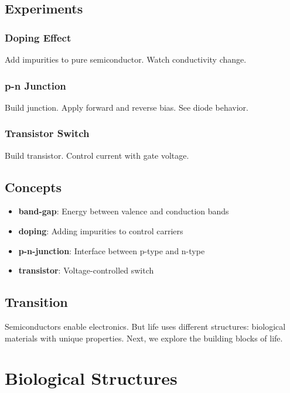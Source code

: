 \documentclass[
  11pt,
  letterpaper,
  twoside,
  openright]{book}
\providecommand{\tightlist}{%
  \setlength{\itemsep}{0pt}\setlength{\parskip}{0pt}}
\begin{document}
\section{Experiments}\label{experiments-13}

\subsection{Doping Effect}\label{doping-effect}

Add impurities to pure semiconductor. Watch conductivity change.

\subsection{p-n Junction}\label{p-n-junction}

Build junction. Apply forward and reverse bias. See diode behavior.

\subsection{Transistor Switch}\label{transistor-switch}

Build transistor. Control current with gate voltage.

\section{Concepts}\label{concepts-13}

\begin{itemize}
\tightlist
\item
  \textbf{band-gap}: Energy between valence and conduction bands
\item
  \textbf{doping}: Adding impurities to control carriers
\item
  \textbf{p-n-junction}: Interface between p-type and n-type
\item
  \textbf{transistor}: Voltage-controlled switch
\end{itemize}

\section{Transition}\label{transition-13}

Semiconductors enable electronics. But life uses different structures:
biological materials with unique properties. Next, we explore the
building blocks of life.

\chapter{Biological Structures}\label{sec-biological-structures}
\end{document}
